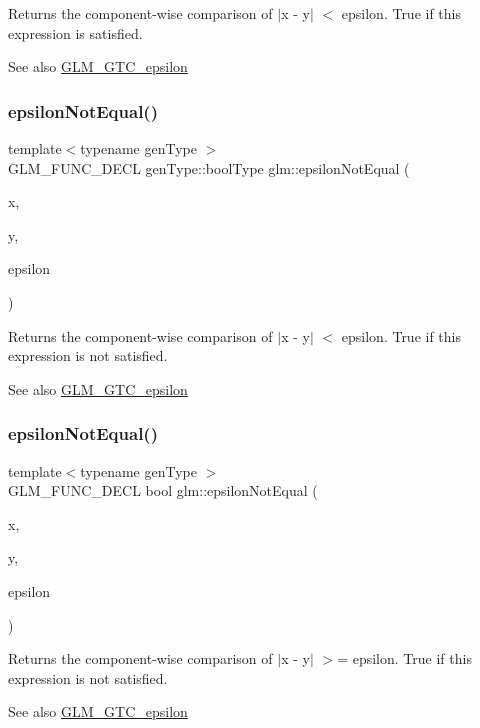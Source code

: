 Returns the component-\/wise comparison of $\vert$x -\/ y$\vert$ $<$ epsilon. True if this expression is satisfied.

\begin{DoxySeeAlso}{See also}
\hyperlink{group__gtc__epsilon}{G\+L\+M\+\_\+\+G\+T\+C\+\_\+epsilon} 
\end{DoxySeeAlso}
\mbox{\label{group__gtc__epsilon_ga14e2888a304654ade8a3996024e2739c}} 
\subsubsection{\texorpdfstring{epsilon\+Not\+Equal()}{epsilonNotEqual()}\hspace{0.1cm}{\footnotesize\ttfamily [1/2]}}
{\footnotesize\ttfamily template$<$typename gen\+Type $>$ \\
G\+L\+M\+\_\+\+F\+U\+N\+C\+\_\+\+D\+E\+CL gen\+Type\+::bool\+Type glm\+::epsilon\+Not\+Equal (\begin{DoxyParamCaption}\item[{gen\+Type const \&}]{x,  }\item[{gen\+Type const \&}]{y,  }\item[{typename gen\+Type\+::value\+\_\+type const \&}]{epsilon }\end{DoxyParamCaption})}

Returns the component-\/wise comparison of $\vert$x -\/ y$\vert$ $<$ epsilon. True if this expression is not satisfied.

\begin{DoxySeeAlso}{See also}
\hyperlink{group__gtc__epsilon}{G\+L\+M\+\_\+\+G\+T\+C\+\_\+epsilon} 
\end{DoxySeeAlso}
\mbox{\label{group__gtc__epsilon_ga50a92103fb0cbd796908e1bf20c79aaf}} 
\subsubsection{\texorpdfstring{epsilon\+Not\+Equal()}{epsilonNotEqual()}\hspace{0.1cm}{\footnotesize\ttfamily [2/2]}}
{\footnotesize\ttfamily template$<$typename gen\+Type $>$ \\
G\+L\+M\+\_\+\+F\+U\+N\+C\+\_\+\+D\+E\+CL bool glm\+::epsilon\+Not\+Equal (\begin{DoxyParamCaption}\item[{gen\+Type const \&}]{x,  }\item[{gen\+Type const \&}]{y,  }\item[{gen\+Type const \&}]{epsilon }\end{DoxyParamCaption})}

Returns the component-\/wise comparison of $\vert$x -\/ y$\vert$ $>$= epsilon. True if this expression is not satisfied.

\begin{DoxySeeAlso}{See also}
\hyperlink{group__gtc__epsilon}{G\+L\+M\+\_\+\+G\+T\+C\+\_\+epsilon} 
\end{DoxySeeAlso}
